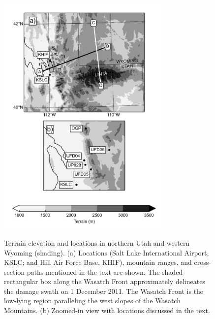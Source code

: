 \documentclass[pdftex,12pt]{article}
\begin{document}
\begin{figure}[t]
\centering
\noindent\includegraphics[width=0.77\textwidth]{map2}\\
\caption{Terrain elevation and locations in northern Utah and western Wyoming (shading). (a) Locations (Salt Lake International Airport, KSLC; and Hill Air Force Base, KHIF), mountain ranges, and cross-section paths mentioned in the text are shown.  The shaded rectangular box along the Wasatch Front approximately delineates the damage swath on 1 December 2011. The Wasatch Front is the low-lying region paralleling the west slopes of the Wasatch Mountains. (b) Zoomed-in view with locations discussed in the text.}
\label{fig:wasatchmap}
\end{figure}
\end{document}
